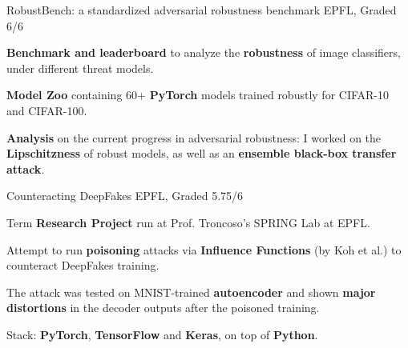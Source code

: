 

\begin{cventries}
  \cventry
  {RobustBench: a standardized adversarial robustness benchmark} %
  {} %
  {} %
  {EPFL, Graded 6/6} %
  {
    \begin{cvitems} %
      \item \textbf{Benchmark and leaderboard} to analyze the \textbf{robustness} of image classifiers, under different threat models.
      \item \textbf{Model Zoo} containing 60+ \textbf{PyTorch} models trained robustly for CIFAR-10 and CIFAR-100.
      \item \textbf{Analysis} on the current progress in adversarial robustness: I worked on the \textbf{Lipschitzness} of robust models, as well as an \textbf{ensemble black-box transfer attack}.
    \end{cvitems}
  }
  
  \cventry
  {Counteracting DeepFakes} %
  {} %
  {} %
  {EPFL, Graded 5.75/6} %
  {
    \begin{cvitems} %
      \item Term \textbf{Research Project} run at Prof. Troncoso's SPRING Lab at EPFL.
      \item Attempt to run \textbf{poisoning} attacks via \textbf{Influence Functions} (by Koh et al.) to counteract DeepFakes training.
      \item The attack was tested on MNIST-trained \textbf{autoencoder} and shown \textbf{major distortions} in the decoder outputs after the poisoned training.
      \item Stack: \textbf{PyTorch}, \textbf{TensorFlow} and \textbf{Keras}, on top of \textbf{Python}.
    \end{cvitems}
  }
  

\end{cventries}
